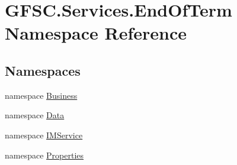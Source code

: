 \hypertarget{namespace_g_f_s_c_1_1_services_1_1_end_of_term}{}\section{G\+F\+S\+C.\+Services.\+End\+Of\+Term Namespace Reference}
\label{namespace_g_f_s_c_1_1_services_1_1_end_of_term}
\subsection*{Namespaces}
\begin{DoxyCompactItemize}
\item 
namespace \mbox{\hyperlink{namespace_g_f_s_c_1_1_services_1_1_end_of_term_1_1_business}{Business}}
\item 
namespace \mbox{\hyperlink{namespace_g_f_s_c_1_1_services_1_1_end_of_term_1_1_data}{Data}}
\item 
namespace \mbox{\hyperlink{namespace_g_f_s_c_1_1_services_1_1_end_of_term_1_1_i_m_service}{I\+M\+Service}}
\item 
namespace \mbox{\hyperlink{namespace_g_f_s_c_1_1_services_1_1_end_of_term_1_1_properties}{Properties}}
\end{DoxyCompactItemize}
